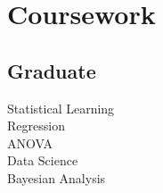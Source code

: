 \documentclass[]{plushcv}
\begin{document}
\begin{minipage}[t]{0.25\textwidth}



\section{Coursework}

\subsection{Graduate}
Statistical Learning \textbullet{}\\ 
Regression \textbullet{}\\ 
ANOVA \textbullet{} \\ 
Data Science \textbullet{}\\
Bayesian Analysis \\
\sectionsep



\end{minipage} 
\end{document}
